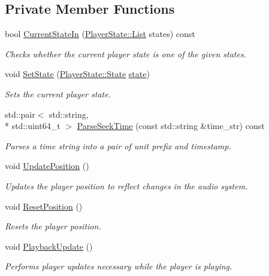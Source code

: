 \subsection*{Private Member Functions}
\begin{DoxyCompactItemize}
\item 
bool \hyperlink{classPlayer_aa56e60cd7b83a4aa7ebda1e6ec054f4d}{Current\+State\+In} (\hyperlink{classPlayerState_a0f4e455f0579f97740855ccc6177c9f1}{Player\+State\+::\+List} states) const 
\begin{DoxyCompactList}\small\item\em Checks whether the current player state is one of the given states. \end{DoxyCompactList}\item 
void \hyperlink{classPlayer_a92807b30e89ece50e94dac493ee56b51}{Set\+State} (\hyperlink{classPlayerState_ab013f68ff23d69d677faae624b5dff07}{Player\+State\+::\+State} \hyperlink{classPlayer_afb60fdad921bce05783ef2709e849c27}{state})
\begin{DoxyCompactList}\small\item\em Sets the current player state. \end{DoxyCompactList}\item 
std\+::pair$<$ std\+::string, \\*
std\+::uint64\+\_\+t $>$ \hyperlink{classPlayer_a9928623cdd372a0abee02fb21de083da}{Parse\+Seek\+Time} (const std\+::string \&time\+\_\+str) const 
\begin{DoxyCompactList}\small\item\em Parses a time string into a pair of unit prefix and timestamp. \end{DoxyCompactList}\item 
void \hyperlink{classPlayer_aa055a70690c66e3fd9949358fccadd5c}{Update\+Position} ()
\begin{DoxyCompactList}\small\item\em Updates the player position to reflect changes in the audio system. \end{DoxyCompactList}\item 
void \hyperlink{classPlayer_a66e226836bf4d6cd206716caeb232094}{Reset\+Position} ()
\begin{DoxyCompactList}\small\item\em Resets the player position. \end{DoxyCompactList}\item 
\hypertarget{classPlayer_affe746dc330ee92b64e2093c84858625}{void \hyperlink{classPlayer_affe746dc330ee92b64e2093c84858625}{Playback\+Update} ()}\label{classPlayer_affe746dc330ee92b64e2093c84858625}

\begin{DoxyCompactList}\small\item\em Performs player updates necessary while the player is playing. \end{DoxyCompactList}\end{DoxyCompactItemize}
